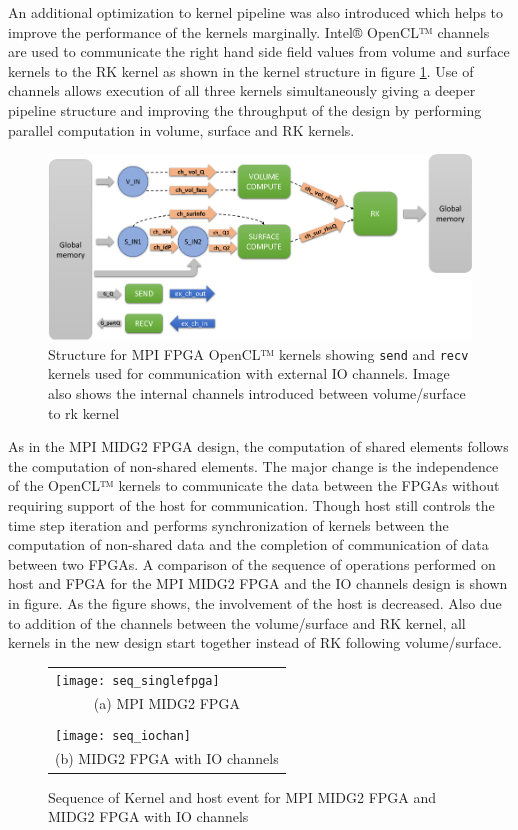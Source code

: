 An additional optimization to kernel pipeline
was also introduced which helps to improve the performance of the kernels marginally.
Intel® OpenCL™ channels are used to communicate the right hand side field values
from volume and surface kernels to the RK kernel as shown in the kernel structure
in figure \ref{fig:iochan_kernstruc}. Use of channels allows execution of all three
kernels simultaneously giving a deeper pipeline structure and improving the throughput
of the design by performing parallel computation in volume, surface and RK kernels.

\begin{figure}[h]%
    \centering
    \includegraphics[width=1.0\textwidth]{images/iochan_kernstruc}
    \caption{Structure for MPI FPGA OpenCL™ kernels showing \texttt{send} and \texttt{recv}
    kernels used for communication with external IO channels. Image also shows the internal
    channels introduced between volume/surface to rk kernel}
    \label{fig:iochan_kernstruc}
\end{figure}

As in the MPI MIDG2 FPGA design, the computation of shared elements follows the computation of
non-shared elements. The major change is the independence of the OpenCL™ kernels to
communicate the data between the FPGAs without requiring support of the host for
communication. Though host still controls the time step iteration and performs synchronization of kernels between
the computation of non-shared data and the completion of communication of data between two FPGAs.
A comparison of the sequence of operations performed on host and FPGA for the MPI MIDG2 FPGA and
the IO channels design is shown in figure. As the figure shows, the involvement of the host is
decreased. Also due to addition of the channels between the volume/surface and RK kernel,
all kernels in the new design start together instead of RK following volume/surface.

\begin{figure}[h]
	\centering\small
	\begin{tabular}{l@{\hskip 0.5in}}
        \texttt{[image: seq\_singlefpga]} \\
        \multicolumn{1}{c}{(a) MPI MIDG2 FPGA}  \\
        \\
        \texttt{[image: seq\_iochan]} \\
        \multicolumn{1}{c}{(b) MIDG2 FPGA with IO channels}
	\end{tabular}
    \caption{Sequence of Kernel and host event for MPI MIDG2 FPGA
    and MIDG2 FPGA with IO channels}
	\label{fig:topologies}
\end{figure}

